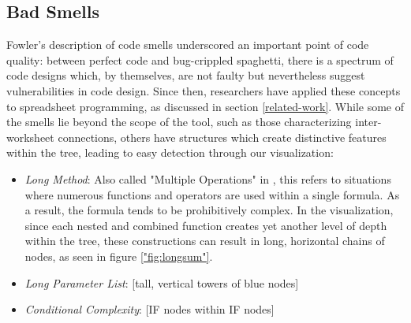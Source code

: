 \documentclass[conference]{IEEEtran}
\begin{document}
	\subsection{Bad Smells} Fowler's description of code smells
	\cite{fowler2009refactoring} underscored an important point of code quality:
	between perfect code and bug-crippled spaghetti,  there is a spectrum of code
	designs which, by themselves, are not faulty but nevertheless suggest vulnerabilities in code design. 	
	Since then, researchers have applied these concepts to spreadsheet programming, as 
	discussed in section \ref{related-work}. While some of the smells lie beyond the scope
	of the tool, such as those characterizing inter-worksheet connections, others
	have structures which create distinctive features within the tree, leading to
	easy detection through our visualization: \par
	
	\begin{itemize} 
		
		\item \textit{Long Method}: Also called "Multiple Operations"
		in \cite{hermans2012detecting}, this refers to situations where numerous
		functions and operators are used within a single formula. As a result, the formula
		tends to be prohibitively complex. In the visualization, since each nested and combined function
		creates yet another level of depth within the tree, these constructions can
		result in long, horizontal chains of nodes, as seen in figure
		\ref{"fig:longsum"}. 
		
		\item \textit{Long Parameter List}: [tall, vertical towers
		of blue nodes] 
		
		\item \textit{Conditional Complexity}: [IF nodes within IF
		nodes] \end{itemize}
	
\end{document}

